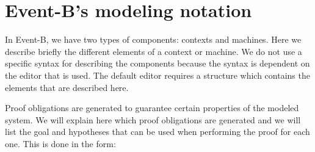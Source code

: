 \newcommand{\varlist}[1]{\mathbf{#1}}
\newcommand{\allconstants}{\varlist{c}}
\newcommand{\absvariables}{\varlist{v}}
\newcommand{\concvariables}{\varlist{w}}
\newcommand{\allvariables}{{\absvariables,\concvariables}}
\newcommand{\absparameters}{\varlist{t}}
\newcommand{\concparameters}{\varlist{u}}
\newcommand{\allparameters}{{\absparameters,\concparameters}}
\newcommand{\absbeforeafter}{\mathcal{S}}
\newcommand{\concbeforeafter}{\mathcal{T}}

\newcommand{\axioms}{A(\allconstants)}
\newcommand{\absinvariants}{I(\allconstants,\absvariables)}
\newcommand{\concinvariants}{J(\allconstants,\absvariables,\concvariables)}
\newcommand{\absguards}{G(\allconstants,\absvariables,\absparameters)}
\newcommand{\concguards}{H(\allconstants,\concvariables,\concparameters)}
\newcommand{\witnesspred}{W(\allconstants,\allvariables,\absvariables',\concvariables',\allparameters)}
\newcommand{\bapred}{\concbeforeafter(\allparameters,\concvariables,\concparameters,\concvariables')}

\clearpage

\section{Event-B's modeling notation}
\label{modeling_notation}

In Event-B, we have two types of components: contexts and machines.
Here we describe briefly the different elements of a context or machine.
We do not use a specific syntax for describing the components because the syntax is dependent on the editor that is
used. The default editor requires a structure which contains the elements that are described here.

Proof obligations are generated to guarantee certain properties of the modeled system.
We will explain here which proof obligations are generated and we will list the goal and hypotheses that can be used
when performing the proof for each one.
This is done in the form:

